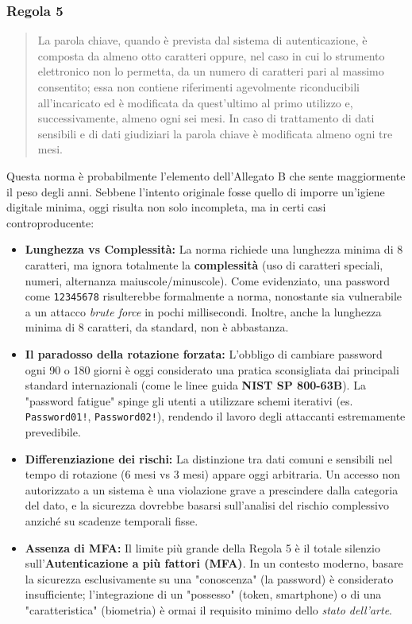 \subsubsection*{Regola 5}
\begin{quote}
    La parola chiave, quando è prevista dal sistema di autenticazione, è composta da almeno otto caratteri oppure, nel caso in cui lo strumento elettronico non lo permetta, da un numero di caratteri pari al massimo consentito;
    essa non contiene riferimenti agevolmente riconducibili all'incaricato ed è modificata da quest'ultimo al primo utilizzo e, successivamente, almeno ogni sei mesi.
    In caso di trattamento di dati sensibili e di dati giudiziari la parola chiave è modificata almeno ogni tre mesi.
\end{quote}
Questa norma è probabilmente l'elemento dell'Allegato B che sente maggiormente il peso degli anni.
Sebbene l'intento originale fosse quello di imporre un'igiene digitale minima, oggi risulta non solo incompleta, ma in certi casi controproducente:

\begin{itemize}
    \item \textbf{Lunghezza vs Complessità:} La norma richiede una lunghezza minima di 8 caratteri, ma ignora totalmente la \textbf{complessità} (uso di caratteri speciali, numeri, alternanza maiuscole/minuscole).
    Come evidenziato, una password come \texttt{12345678} risulterebbe formalmente a norma, nonostante sia vulnerabile a un attacco \textit{brute force} in pochi millisecondi.
    Inoltre, anche la lunghezza minima di 8 caratteri, da standard, non è abbastanza.
    \item \textbf{Il paradosso della rotazione forzata:} L'obbligo di cambiare password ogni 90 o 180 giorni è oggi considerato una pratica sconsigliata dai principali standard internazionali (come le linee guida \textbf{NIST SP 800-63B}).
    La "password fatigue" spinge gli utenti a utilizzare schemi iterativi (es. \texttt{Password01!}, \texttt{Password02!}), rendendo il lavoro degli attaccanti estremamente prevedibile.
    \item \textbf{Differenziazione dei rischi:} La distinzione tra dati comuni e sensibili nel tempo di rotazione (6 mesi vs 3 mesi) appare oggi arbitraria.
    Un accesso non autorizzato a un sistema è una violazione grave a prescindere dalla categoria del dato, e la sicurezza dovrebbe basarsi sull'analisi del rischio complessivo anziché su scadenze temporali fisse.
    \item \textbf{Assenza di MFA:} Il limite più grande della Regola 5 è il totale silenzio sull'\textbf{Autenticazione a più fattori (MFA)}.
    In un contesto moderno, basare la sicurezza esclusivamente su una "conoscenza" (la password) è considerato insufficiente;
    l'integrazione di un "possesso" (token, smartphone) o di una "caratteristica" (biometria) è ormai il requisito minimo dello \textit{stato dell'arte}.
\end{itemize}

